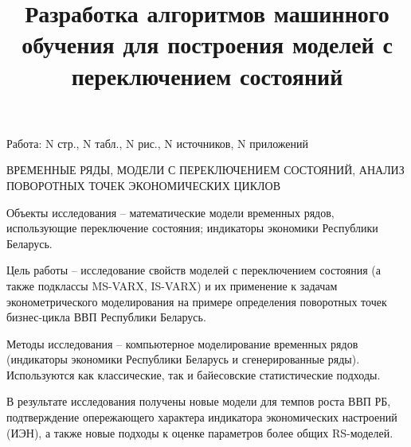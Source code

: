 \documentclass[a4paper,14pt]{extreport}
\title{Разработка алгоритмов машинного обучения для построения моделей с переключением состояний}
\author{\@authorlast \@authorfirst}
\begin{document}
\maketitle








Работа: N стр., N табл., N рис., N источников, N приложений

\MakeUppercase{временные ряды, модели с переключением состояний, анализ поворотных точек экономических циклов}

Объекты исследования -- математические модели временных рядов, использующие переключение состояния; индикаторы экономики Республики Беларусь.

Цель работы -- исследование свойств моделей с переключением состояния (а также подклассы MS-VARX, IS-VARX) и их применение к задачам эконометрического моделирования на примере определения поворотных точек бизнес-цикла ВВП Республики Беларусь.

Методы исследования -- компьютерное моделирование временных рядов (индикаторы экономики Республики Беларусь и сгенерированные ряды). Используются как классические, так и байесовские статистические подходы.

В результате исследования получены новые модели для темпов роста ВВП РБ, подтверждение опережающего характера индикатора экономических настроений (ИЭН), а также новые подходы к оценке параметров более общих RS-моделей.


\end{document}
